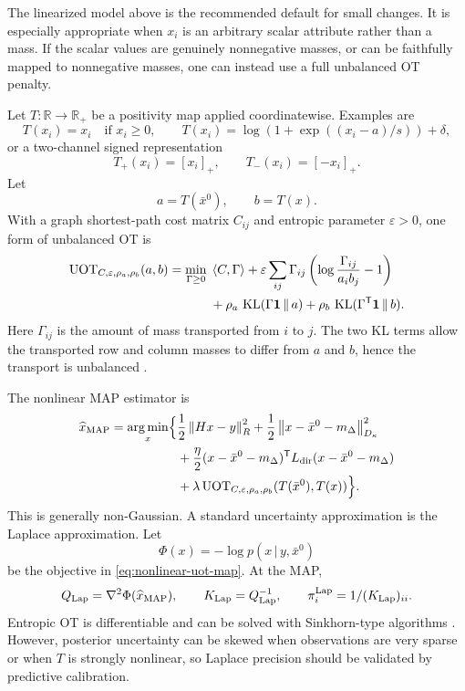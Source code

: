 \documentclass[11pt]{article}
\numberwithin{equation}{section}
\newcommand{\R}{\mathbb{R}}
\newcommand{\KL}{\operatorname{KL}}
\newcommand{\argmin}{\operatorname*{arg\,min}}
\newcommand{\ones}{\mathbf{1}}
\newcommand{\eps}{\varepsilon}
\newcommand{\transpose}{^{\mathsf T}}
\newcommand{\given}{\,|\,}
\newcommand{\norm}[1]{\left\lVert #1\right\rVert}
\newcommand{\inner}[2]{\left\langle #1,#2\right\rangle}
\newcommand{\half}{\frac{1}{2}}
\begin{document}
The linearized model above is the recommended default for small changes.  It is especially appropriate when $x_i$ is an arbitrary scalar attribute rather than a mass.  If the scalar values are genuinely nonnegative masses, or can be faithfully mapped to nonnegative masses, one can instead use a full unbalanced OT penalty.

Let $T:\R\to\R_+$ be a positivity map applied coordinatewise.  Examples are
\begin{equation}
  T(x_i)=x_i\quad\text{if }x_i\ge0,
  \qquad
  T(x_i)=\log(1+\exp((x_i-a)/s))+\delta,
  \label{eq:positivity-map}
\end{equation}
or a two-channel signed representation
\begin{equation}
  T_+(x_i)=[x_i]_+,
  \qquad
  T_-(x_i)=[-x_i]_+.
  \label{eq:two-channel}
\end{equation}
Let
\[
  a=T(\bar x^0),
  \qquad
  b=T(x).
\]
With a graph shortest-path cost matrix $C_{ij}$ and entropic parameter $\eps>0$, one form of unbalanced OT is
\begin{align}
  \operatorname{UOT}_{C,\eps,\rho_a,\rho_b}(a,b)
  =\min_{\Gamma\ge0}\;&
  \inner{C}{\Gamma}
  +\eps\sum_{ij}\Gamma_{ij}\left(\log\frac{\Gamma_{ij}}{a_ib_j}-1\right)\notag\\
  &+\rho_a\,\KL(\Gamma\ones\,\|\,a)
  +\rho_b\,\KL(\Gamma\transpose\ones\,\|\,b).
  \label{eq:full-uot}
\end{align}
Here $\Gamma_{ij}$ is the amount of mass transported from $i$ to $j$.  The two KL terms allow the transported row and column masses to differ from $a$ and $b$, hence the transport is unbalanced \cite{Chizat2018,Sejourne2022}.

The nonlinear MAP estimator is
\begin{align}
  \widehat x_{\rm MAP}
  =\argmin_x\Bigl\{&
  \half\norm{Hx-y}_R^2
  +\half\norm{x-\bar x^0-m_\Delta}_{D_\kappa}^2\notag\\
  &+\frac{\eta}{2}(x-\bar x^0-m_\Delta)\transpose
    L_{\rm dir}(x-\bar x^0-m_\Delta)\notag\\
  &+\lambda\operatorname{UOT}_{C,\eps,\rho_a,\rho_b}
    (T(\bar x^0),T(x))\Bigr\}.
  \label{eq:nonlinear-uot-map}
\end{align}
This is generally non-Gaussian.  A standard uncertainty approximation is the Laplace approximation.  Let
\begin{equation}
  \Phi(x)=-\log p(x\given y,\bar x^0)
  \label{eq:Phi-nonlinear}
\end{equation}
be the objective in \eqref{eq:nonlinear-uot-map}.  At the MAP,
\begin{equation}
  Q_{\rm Lap}=\nabla^2\Phi(\widehat x_{\rm MAP}),
  \qquad
  K_{\rm Lap}=Q_{\rm Lap}^{-1},
  \qquad
  \pi_i^{\rm Lap}=1/(K_{\rm Lap})_{ii}.
  \label{eq:Laplace}
\end{equation}
Entropic OT is differentiable and can be solved with Sinkhorn-type algorithms \cite{Cuturi2013,Chizat2018,Flamary2021,Cuturi2022OTT}.  However, posterior uncertainty can be skewed when observations are very sparse or when $T$ is strongly nonlinear, so Laplace precision should be validated by predictive calibration.
\end{document}

